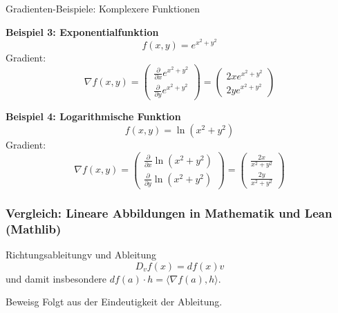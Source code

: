 \documentclass{beamer}
\begin{document}
    \begin{frame}{Gradienten-Beispiele: Komplexere Funktionen}
    
    \textbf{Beispiel 3: Exponentialfunktion}
    \[
    f(x, y) = e^{x^2 + y^2}
    \]
    Gradient:
    \[
    \nabla f(x, y) = 
    \begin{pmatrix}
    \frac{\partial}{\partial x} e^{x^2 + y^2} \\
    \frac{\partial}{\partial y} e^{x^2 + y^2}
    \end{pmatrix}
    = 
    \begin{pmatrix}
    2x e^{x^2 + y^2} \\
    2y e^{x^2 + y^2}
    \end{pmatrix}
    \]
    
    \textbf{Beispiel 4: Logarithmische Funktion}
    \[
    f(x, y) = \ln(x^2 + y^2)
    \]
    Gradient:
    \[
    \nabla f(x, y) = 
    \begin{pmatrix}
    \frac{\partial}{\partial x} \ln(x^2 + y^2) \\
    \frac{\partial}{\partial y} \ln(x^2 + y^2)
    \end{pmatrix}
    = 
    \begin{pmatrix}
    \frac{2x}{x^2 + y^2} \\
    \frac{2y}{x^2 + y^2}
    \end{pmatrix}
    \]
    
    \end{frame}
    

         
    \begin{frame}
        \frametitle{Vergleich: Lineare Abbildungen in Mathematik und Lean (Mathlib)}
        
        
        \begin{block}{Richtungsableitungv und Ableitung}
            \[
                D_v f (x) = df(x) v
            \]
            und damit insbesondere  $df(a) \cdot h = \langle \nabla f (a) , h \rangle$.
        \end{block}

        \begin{block}{Beweisg}
            Folgt aus der Eindeutigkeit der Ableitung.
        \end{block}
    \end{frame}
\end{document}
